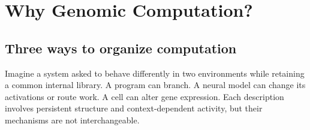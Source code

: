 \chapter{Why Genomic Computation?}\label{ch:why}

\section{Three ways to organize computation}\label{sec:organizations}
Imagine a system asked to behave differently in two environments while retaining a common internal library. A program can branch. A neural model can change its activations or route work. A cell can alter gene expression. Each description involves persistent structure and context-dependent activity, but their mechanisms are not interchangeable.

